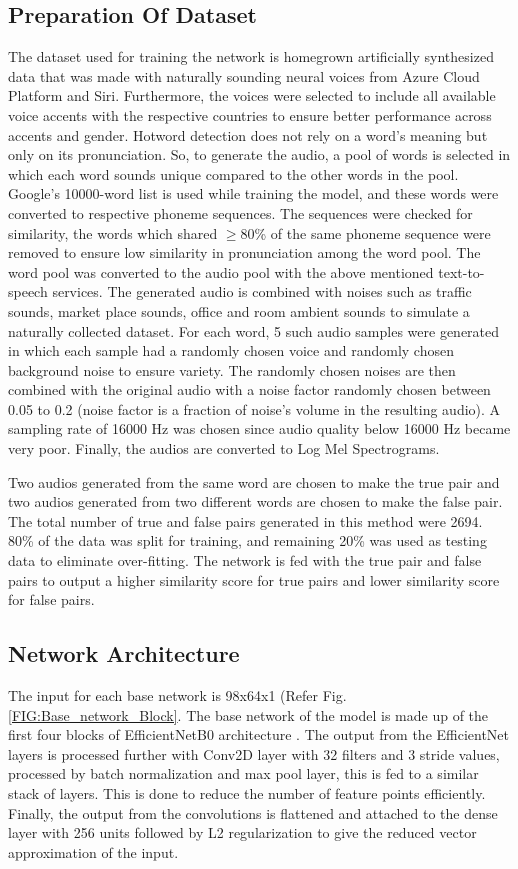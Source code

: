 \documentclass[10pt,twocolumn]{article}
\begin{document}
\subsection{Preparation Of Dataset}
The dataset used for training the network is homegrown artificially synthesized data that was made with naturally sounding neural voices from Azure Cloud Platform and Siri. Furthermore, the voices were selected to include all available voice accents with the respective countries to ensure better performance across accents and gender. Hotword detection does not rely on a word’s meaning but only on its pronunciation. So, to generate the audio, a pool of words is selected in which each word sounds unique compared to the other words in the pool. Google’s 10000-word list \cite{kaufman_bathman_myers_hingston} is used while training the model, and these words were converted to respective phoneme sequences. The sequences were checked for similarity, the words which shared $\ge$80\% of the same phoneme sequence were removed to ensure low similarity in pronunciation among the word pool. The word pool was converted to the audio pool with the above mentioned text-to-speech services. The generated audio is combined with noises such as traffic sounds, market place sounds, office and room ambient sounds to simulate a naturally collected dataset. For each word, 5 such audio samples were generated in which each sample had a randomly chosen voice and randomly chosen background noise to ensure variety. The randomly chosen noises are then combined with the original audio with a noise factor randomly chosen between 0.05 to 0.2 (noise factor is a fraction of noise’s volume in the resulting audio). A sampling rate of 16000 Hz was chosen since audio quality below 16000 Hz became very poor. Finally, the audios are converted to Log Mel Spectrograms.

Two audios generated from the same word are chosen to make the true pair and two audios generated from two different words are chosen to make the false pair. The total number of true and false pairs generated in this method were 2694. 80\% of the data was split for training, and remaining 20\% was used as testing data to eliminate over-fitting. The network is fed with the true pair and false pairs to output a higher similarity score for true pairs and lower similarity score for false pairs.

\subsection{Network Architecture}
The input for each base network is 98x64x1 (Refer Fig. \ref {FIG:Base_network_Block}. The base network of the model is made up of the first four blocks of EfficientNetB0 architecture \cite{tan2020efficientnet}. The output from the EfficientNet layers is processed further with Conv2D layer with 32 filters and 3 stride values, processed by batch normalization and max pool layer, this is fed to a similar stack of layers. This is done to reduce the number of feature points efficiently. Finally, the output from the convolutions is flattened and attached to the dense layer with 256 units followed by L2 regularization to give the reduced vector approximation of the input.
\end{document}

